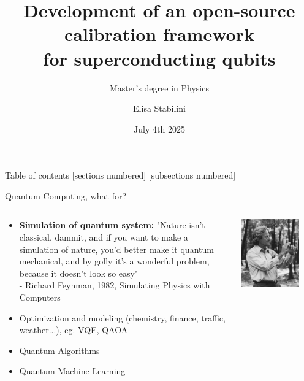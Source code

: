 \documentclass[aspectratio=169,10pt]{beamer}
\title{Development of an open-source calibration framework\\ for superconducting qubits}
\subtitle{Master's degree in Physics}
\author{Elisa Stabilini}
\institute{Università degli Studi di Milano - Department of Physics}
\date{July 4th 2025}
\begin{document}
\maketitle

\begin{frame}{Table of contents}
    [sections numbered]
    [subsections numbered]  
    \tableofcontents[hideallsubsections]
\end{frame}

\begin{frame}{Quantum Computing, what for?}
  \begin{columns}
    \begin{column}{0.5\textwidth}
      \begin{itemize}[label=\textbullet]
        \item \textbf{Simulation of quantum system:} "Nature isn't classical, dammit, and if you want to make a simulation of nature, you'd better make it quantum mechanical, and by golly it's a wonderful problem, because it doesn't look so easy"\\
                 - Richard Feynman, 1982, Simulating Physics with Computers
        \item Optimization and modeling (chemistry, finance, traffic, weather...), eg. VQE, QAOA
        \item Quantum Algorithms 
        \item Quantum Machine Learning
      \end{itemize}
      \end{column}
      \begin{column}{0.5\textwidth}
        \begin{center}
            \includegraphics[width=0.8\textwidth]{figures/feynmann.jpg}
        \end{center}
      \end{column}
  \end{columns}
\end{frame}
\end{document}

